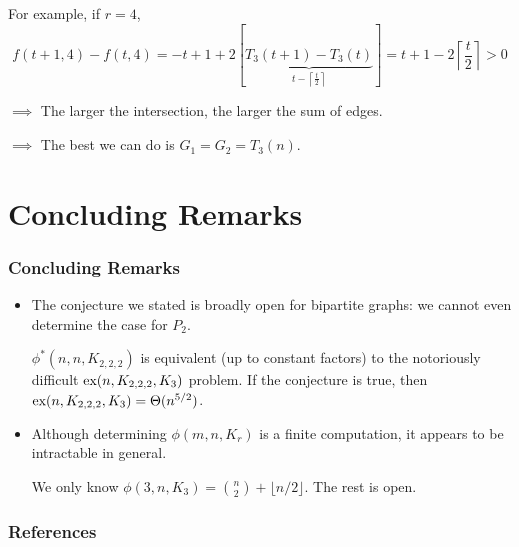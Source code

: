 \documentclass{beamer}
\newcommand*{\ex}{\textnormal{ex}}
\begin{document}
\begin{frame}
  \vspace{0.5cm}

  For example, if $r = 4$,
  \[
    f(t + 1, 4) - f(t, 4) = -t + 1 + 2[\underbrace{T_3(t + 1) - T_3(t)}_{t - \left\lceil\frac{t}{2}\right\rceil}] = t + 1 - 2\left\lceil\frac{t}{2}\right\rceil > 0
  \]

  \pause

  $\implies$ The larger the intersection, the larger the sum of edges.

  \pause

  \vspace{0.3cm}

  $\implies$ The best we can do is $G_1 = G_2 = T_3(n)$.
\end{frame}

\section{Concluding Remarks}

\begin{frame}
  \frametitle{Concluding Remarks}

  \begin{itemize}
    \item The conjecture we stated is broadly open for bipartite graphs: we cannot even determine the case for $P_2$. 
    
    \pause
    
    \vspace{0.3cm}

    $\phi^*(n, n, K_{2,2,2})$ is equivalent (up to constant factors) to the notoriously difficult $\ex(n, K_{2,2,2}, K_3)$ problem. If the conjecture is true, then $\ex(n, K_{2,2,2}, K_3) = \Theta(n^{5/2})$.

    \pause

    \vspace{0.3cm}

    \item Although determining $\phi(m, n, K_r)$ is a finite computation, it appears to be intractable in general.
    
    \pause

    \vspace{0.3cm}

    We only know $\phi(3, n, K_3) = \binom{n}{2} + \lfloor n/2\rfloor$. The rest is open.
  \end{itemize}
\end{frame}

\begin{frame}[allowframebreaks] 
  \frametitle{References}
  \tiny
  \printbibliography
\end{frame}
\end{document}

